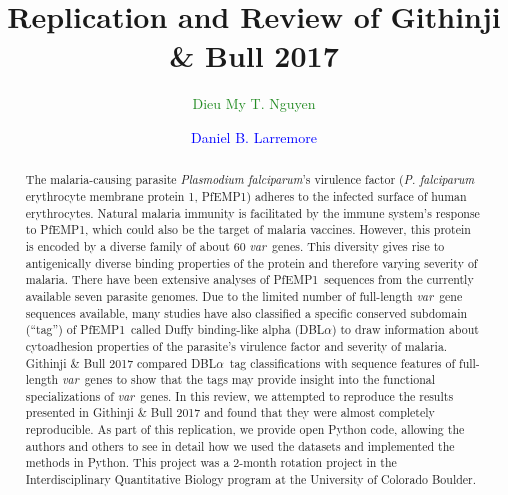 \documentclass[10pt,twocolumn,superscriptaddress]{revtex4-1}
\newcommand{\dieumy}[1]{\textcolor{ForestGreen}{#1}}
\newcommand{\dan}[1]{\textcolor{blue}{#1}}
\newcommand{\var}{{\it var}\xspace}
\newcommand{\pf}{{\it P. falciparum}\xspace}
\newcommand{\pfem}{{PfEMP1}\xspace}
\newcommand{\dbla}{{DBL$\alpha$}\xspace}
\newcommand{\paper}{{Githinji \& Bull}\xspace}
\begin{document}
\author{\dieumy{Dieu My T. Nguyen}}
\author{\dan{Daniel B. Larremore}}
	

\title{Replication and Review of \paper 2017}
\begin{abstract}
The malaria-causing parasite \textit{Plasmodium falciparum}'s virulence factor (\pf erythrocyte membrane protein 1, \pfem) adheres to the infected surface of human erythrocytes. Natural malaria immunity is facilitated by the immune system's response to \pfem, which could also be the target of malaria vaccines. However, this protein is encoded by a diverse family of about 60 \var\ genes. This diversity gives rise to antigenically diverse binding properties of the protein and therefore varying severity of malaria. There have been extensive analyses of \pfem\ sequences from the currently available seven parasite genomes. Due to the limited number of full-length \var\ gene sequences available, many studies have also classified a specific conserved subdomain (``tag'') of \pfem\ called Duffy binding-like alpha (\dbla) to draw information about cytoadhesion properties of the parasite's virulence factor and severity of malaria. \paper 2017 compared \dbla\ tag classifications with sequence features of full-length \var\ genes to show that the tags may provide insight into the functional specializations of \var\ genes. In this review, we attempted to reproduce the results presented in \paper 2017 and found that they were almost completely reproducible. As part of this replication, we provide open Python code, allowing the authors and others to see in detail how we used the datasets and implemented the methods in Python. This project was a 2-month rotation project in the Interdisciplinary Quantitative Biology program at the University of Colorado Boulder.  
\end{abstract}
\maketitle
\end{document}
